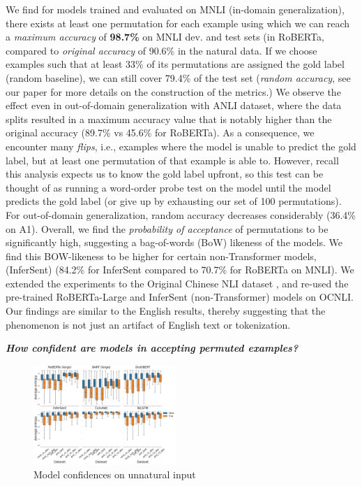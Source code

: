 \documentclass[12pt]{article}
\newcommand{\xit}[1]{{\noindent\textbf{\textit{#1}}}}
\begin{document}
We find for models trained and evaluated on MNLI (in-domain generalization), there exists at least one permutation for each example using which we can reach a \textit{maximum accuracy} of \textbf{98.7\%} on MNLI dev. and test sets (in RoBERTa, compared to \textit{original accuracy} of 90.6\% in the natural data. If we choose examples such that at least 33\% of its permutations are assigned the gold label (random baseline), we can still cover 79.4\% of the test set (\textit{random accuracy}, see our paper \cite{sinha2021a} for more details on the construction of the metrics.)
We observe the effect even in out-of-domain generalization with ANLI dataset, where the data splits resulted in a maximum accuracy value that is notably higher than the original accuracy (89.7\% vs 45.6\% for RoBERTa). As a consequence, we encounter many \textit{flips}, i.e., examples where the model is unable to predict the gold label, but at least one permutation of that example is able to. However, recall this analysis expects us to know the gold label upfront, so this test can be thought of as running a word-order probe test on the model until the model predicts the gold label (or give up by exhausting our set of 100 permutations). For out-of-domain generalization, random accuracy decreases considerably (36.4\% on A1). Overall, we find the \textit{probability of acceptance} of permutations to be significantly high, suggesting a bag-of-words (BoW) likeness of the models. We find this BOW-likeness to be higher for certain non-Transformer models, (InferSent) (84.2\% for InferSent compared to 70.7\% for RoBERTa on MNLI). We extended the experiments to the Original Chinese NLI dataset \citep[OCNLI]{hu-etal-2020-ocnli}, and re-used the pre-trained RoBERTa-Large and InferSent (non-Transformer) models on OCNLI. Our findings are similar to the English results, thereby suggesting that the phenomenon is not just an artifact of English text or tokenization.


\xit{How confident are models in accepting permuted examples?}

\begin{figure}
\begin{center}
  \includegraphics[width=0.48\textwidth]{images/unli_entropy_plot.png}
\end{center}
\caption{Model confidences on unnatural input}
\label{fig:all_entropy}
\end{figure}
\end{document}
